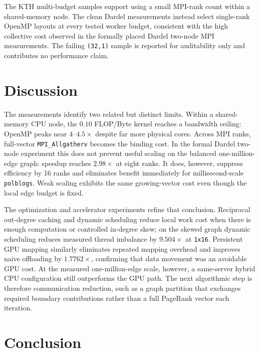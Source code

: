 \documentclass[11pt]{article}
\begin{document}
The KTH multi-budget samples support using a small MPI-rank count within
a shared-memory node. The clean Dardel measurements instead select
single-rank OpenMP layouts at every tested worker budget, consistent
with the high collective cost observed in the formally placed Dardel
two-node MPI measurements. The failing \texttt{(32,1)} sample is
reported for auditability only and contributes no performance claim.

\section{Discussion}
\label{sec:discussion}

The measurements identify two related but distinct limits. Within a
shared-memory CPU node, the $0.10$ FLOP/Byte kernel reaches a bandwidth
ceiling: OpenMP peaks near $4$--$4.5\times$ despite far more physical
cores. Across MPI ranks, full-vector \texttt{MPI\_Allgatherv} becomes
the binding cost. In the formal Dardel two-node experiment this does
not prevent useful scaling on the balanced one-million-edge graph:
speedup reaches $2.98\times$ at eight ranks. It does, however, suppress
efficiency by 16 ranks and eliminates benefit immediately for
millisecond-scale \texttt{polblogs}. Weak scaling exhibits the same
growing-vector cost even though the local edge budget is fixed.

The optimization and accelerator experiments refine that conclusion.
Reciprocal out-degree caching and dynamic scheduling reduce local work
cost when there is enough computation or controlled in-degree skew; on
the skewed graph dynamic scheduling reduces measured thread imbalance
by $9.504\times$ at \texttt{1x16}. Persistent GPU mapping similarly
eliminates repeated mapping overhead and improves naive offloading by
$1.7762\times$, confirming that data movement was an avoidable GPU
cost. At the measured one-million-edge scale, however, a same-server
hybrid CPU configuration still outperforms the GPU path. The next
algorithmic step is therefore communication reduction, such as a graph
partition that exchanges required boundary contributions rather than a
full PageRank vector each iteration.

\section{Conclusion}
\label{sec:conclusion}
\end{document}
